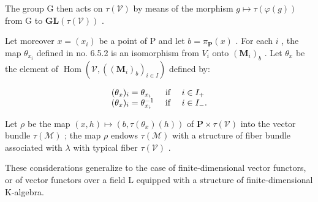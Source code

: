 The group G then acts on \(\tau(\mathcal{V})\) by means of the morphism \(g\mapsto\tau(\varphi(g))\) from G to \(\mathbf{GL}(\tau(\mathcal{V}))\) .

Let moreover \(x = (x_i)\) be a point of P and let \(b = \pi_{\mathbf{P}}(x)\) . For each \(i\) , the map \(\theta_{x_i}\) defined in no. 6.5.2 is an isomorphism from \(V_i\) onto \((\mathbf{M}_i)_b\) . Let \(\theta_x\) be the element of \(\operatorname{Hom}(\mathcal{V}, ((\mathbf{M}_i)_b)_{i \in I})\) defined by:

\[
\begin{array}{l l} (\theta_ {x}) _ {i} = \theta_ {x _ {i}} & \text { if } \quad i \in I _ {+} \\ (\theta_ {x}) _ {i} = \theta_ {x _ {i}} ^ {- 1} & \text { if } \quad i \in I _ {-}. \end{array}
\]

Let \(\rho\) be the map \((x, h) \mapsto (b, \tau(\theta_x)(h))\) of \(\mathbf{P} \times \tau(\mathcal{V})\) into the vector bundle \(\tau(\mathcal{M})\) ; the map \(\rho\) endows \(\tau(\mathcal{M})\) with a structure of fiber bundle associated with \(\lambda\) with typical fiber \(\tau(\mathcal{V})\) .

These considerations generalize to the case of finite-dimensional vector functors, or of vector functors over a field L equipped with a structure of finite-dimensional K-algebra.

